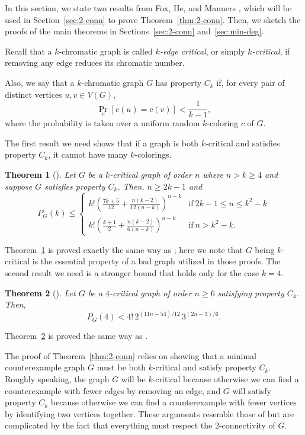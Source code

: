 \documentclass[11pt]{article}
\theoremstyle{plain}
\newtheorem{theorem}{Theorem}[section]
\theoremstyle{definition}
\theoremstyle{remark}
\begin{document}
In this section, we state two results from Fox, He, and Manners \cite{FoHeMa}, which will be used in Section~\ref{sec:2-conn} to prove Theorem~\ref{thm:2-conn}. Then, we sketch the proofs of the main theorems in Sections~\ref{sec:2-conn} and~\ref{sec:min-deg}.

Recall that a $k$-chromatic graph is called {\it $k$-edge critical}, or simply {\it $k$-critical}, if removing any edge reduces its chromatic number.

Also, we say that a $k$-chromatic graph $G$ has property $C_k$ if, for every pair of distinct vertices $u,v\in V(G)$,
\[
\Pr_{c}[c(u)=c(v)] < \frac{1}{k-1},
\]
where the probability is taken over a uniform random $k$-coloring $c$ of $G$.

The first result we need shows that if a graph is both $k$-critical and satisfies property $C_k$, it cannot have many $k$-colorings.

\begin{theorem}[\cite{FoHeMa}]\label{fox_he_general}
Let $G$ be a $k$-critical graph of order $n$ where $n> k \geq 4$ and suppose $G$ satisfies property $C_k$. Then, $n\geq 2k-1$ and 
$$P_G(k)\leq  \begin{cases} 
      k!\left(\frac{7k+5}{12}+\frac{n(k-2)}{12(n-k)}\right)^{n-k} & \text{if}  \ 2k-1\leq n \leq k^2-k \\
       k!\left(\frac{k+1}{2}+\frac{n(k-2)}{6(n-k)}\right)^{n-k} & \text{if} \  n>k^2-k.
      \end{cases}$$
\end{theorem}

Theorem~\ref{fox_he_general} is proved exactly the same way as \cite[Lemma 8 and Theorem 10]{FoHeMa}; here we note that $G$ being $k$-critical is the essential property of a bad graph utilized in those proofs. The second result we need is a stronger bound that holds only for the case $k=4$.

\begin{theorem}[\cite{FoHeMa}]\label{fox_he_4crit}
Let $G$ be a $4$-critical graph of order $n\geq 6$ satisfying property $C_4$. Then,
\[
P_G(4)<4!\,2^{(11n-54)/12}\,3^{(2n-3)/6}.
\]
\end{theorem}

Theorem~\ref{fox_he_4crit} is proved the same way as \cite[Lemma 11]{FoHeMa}.

The proof of Theorem~\ref{thm:2-conn} relies on showing that a minimal counterexample graph $G$ must be both $k$-critical and satisfy property $C_k$. Roughly speaking, the graph $G$ will be $k$-critical because otherwise we can find a counterexample with fewer edges by removing an edge, and $G$ will satisfy property $C_k$ because otherwise we can find a counterexample with fewer vertices by identifying two vertices together. These arguments resemble those of \cite{FoHeMa} but are complicated by the fact that everything must respect the $2$-connectivity of $G$.
\end{document}
